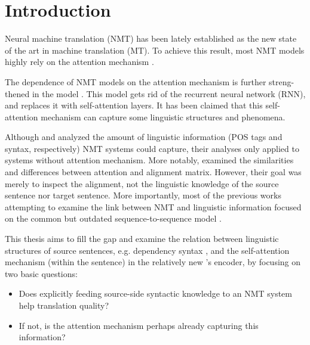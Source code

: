 \chapter*{Introduction}


Neural machine translation (NMT) has been lately established as the new state of the art in machine translation (MT).
To achieve this result, most NMT models highly rely on the attention mechanism \citep{bahdanau:etal:attention:iclr:2015}.

The dependence of NMT models on the attention mechanism is further streng-thened in the \transformer model \citep{DBLP:conf/nips/VaswaniSPUJGKP17}.
This model gets rid of the recurrent neural network (RNN), and replaces it with self-attention layers.
It has been claimed that this self-attention mechanism can capture some linguistic structures and phenomena.

Although \cite{DBLP:conf/acl/BelinkovDDSG17} and \cite{DBLP:conf/emnlp/ShiPK16} analyzed the amount of linguistic information (POS tags and syntax, respectively) NMT systems could capture, their analyses only applied to systems without attention mechanism.
More notably, \cite{DBLP:conf/ijcnlp/GhaderM17} examined the similarities and differences between attention and alignment matrix.
However, their goal was merely to inspect the alignment, not the linguistic knowledge of the source sentence nor target sentence.
More importantly, most of the previous works attempting to examine the link between NMT and linguistic information focused on the common but outdated sequence-to-sequence model \citep{DBLP:conf/nips/SutskeverVL14}.

This thesis aims to fill the gap and examine the relation between linguistic structures of source sentences, e.g. dependency syntax \citep{melvcuk1988dependency}, and the self-attention mechanism (within the sentence) in the relatively new \transformer's encoder, by focusing on two basic questions:
\begin{itemize}
	\item Does explicitly feeding source-side syntactic knowledge to an NMT system help translation quality?
    \item If not, is the attention mechanism perhaps already capturing this information?
\end{itemize}

